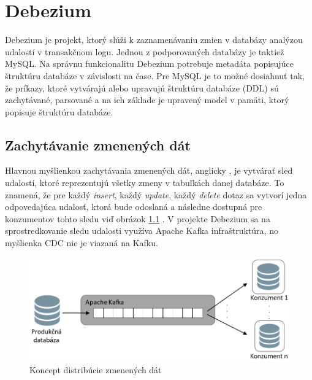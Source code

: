 \chapter{Debezium}
Debezium\cite{Debezium} je projekt, ktorý slúži k zaznamenávaniu zmien v databázy analýzou udalostí v transakčnom logu. Jednou z podporovaných databázy je taktiež MySQL. Na správnu funkcionalitu Debezium potrebuje metadáta popisujúce štruktúru databáze v závislosti na čase. Pre MySQL je to možné dosiahnuť tak, že príkazy, ktoré vytvárajú alebo upravujú štruktúru databáze (DDL) sú zachytávané, parsované a na ich základe je upravený model v pamäti, ktorý popisuje štruktúru databáze.

\section{Zachytávanie zmenených dát}
Hlavnou myšlienkou zachytávania zmenených dát, anglicky , je vytvárať sled udalostí, ktoré reprezentujú všetky zmeny v tabuľkách danej databáze. To znamená, že pre každý \textit{insert}, každý \textit{update}, každý \textit{delete} dotaz sa vytvorí jedna odpovedajúca udalosť, ktorá bude odoslaná a následne dostupná pre konzumentov tohto sledu viď obrázok \ref{fig:CDC} \cite{debezium:devoxx}. V projekte Debezium sa na sprostredkovanie sledu udalosti využíva Apache Kafka \cite{Kafka} infraštruktúra, no myšlienka CDC nie je viazaná na Kafku.

\begin{figure}[H]
\begin{center}
\includegraphics[width=15cm]{figures/CDC_1.PNG}
\caption{Koncept distribúcie zmenených dát}
\label{fig:CDC}
\end{center}
\end{figure}

